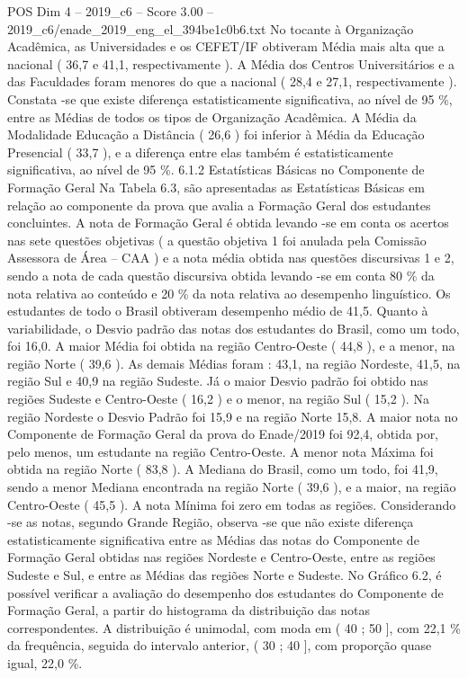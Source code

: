 \begin{textsample}{POS Dim 4 – 2019\_c6 – Score 3.00 – 2019\_c6/enade\_2019\_eng\_el\_394be1c0b6.txt}
No tocante à Organização Acadêmica, as Universidades e os CEFET/IF obtiveram Média mais alta que a nacional ( 36,7 e 41,1, respectivamente ).
A Média dos Centros Universitários e a das Faculdades foram menores do que a nacional ( 28,4 e 27,1, respectivamente ).
Constata -se que existe diferença estatisticamente significativa, ao nível de 95 \%, entre as Médias de todos os tipos de Organização Acadêmica.
A Média da Modalidade Educação a Distância ( 26,6 ) foi inferior à Média da Educação Presencial ( 33,7 ), e a diferença entre elas também é estatisticamente significativa, ao nível de 95 \%. 6.1.2 Estatísticas Básicas no Componente de Formação Geral Na Tabela 6.3, são apresentadas as Estatísticas Básicas em relação ao componente da prova que avalia a Formação Geral dos estudantes concluintes.
A nota de Formação Geral é obtida levando -se em conta os acertos nas sete questões objetivas ( a questão objetiva 1 foi anulada pela Comissão Assessora de Área – CAA ) e a nota média obtida nas questões discursivas 1 e 2, sendo a nota de cada questão discursiva obtida levando -se em conta 80 \% da nota relativa ao conteúdo e 20 \% da nota relativa ao desempenho linguístico.
Os estudantes de todo o Brasil obtiveram desempenho médio de 41,5.
Quanto à variabilidade, o Desvio padrão das notas dos estudantes do Brasil, como um todo, foi 16,0.
A maior Média foi obtida na região Centro-Oeste ( 44,8 ), e a menor, na região Norte ( 39,6 ).
As demais Médias foram : 43,1, na região Nordeste, 41,5, na região Sul e 40,9 na região Sudeste.
Já o maior Desvio padrão foi obtido nas regiões Sudeste e Centro-Oeste ( 16,2 ) e o menor, na região Sul ( 15,2 ).
Na região Nordeste o Desvio Padrão foi 15,9 e na região Norte 15,8.
A maior nota no Componente de Formação Geral da prova do Enade/2019 foi 92,4, obtida por, pelo menos, um estudante na região Centro-Oeste.
A menor nota Máxima foi obtida na região Norte ( 83,8 ).
A Mediana do Brasil, como um todo, foi 41,9, sendo a menor Mediana encontrada na região Norte ( 39,6 ), e a maior, na região Centro-Oeste ( 45,5 ).
A nota Mínima foi zero em todas as regiões.
Considerando -se as notas, segundo Grande Região, observa -se que não existe diferença estatisticamente significativa entre as Médias das notas do Componente de Formação Geral obtidas nas regiões Nordeste e Centro-Oeste, entre as regiões Sudeste e Sul, e entre as Médias das regiões Norte e Sudeste.
No Gráfico 6.2, é possível verificar a avaliação do desempenho dos estudantes do Componente de Formação Geral, a partir do histograma da distribuição das notas correspondentes.
A distribuição é unimodal, com moda em ( 40 ; 50 ], com 22,1 \% da frequência, seguida do intervalo anterior, ( 30 ; 40 ], com proporção quase igual, 22,0 \%.

\end{textsample}

